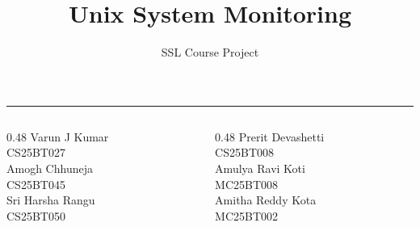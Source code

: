 \documentclass[aspectratio=169,10pt]{beamer}
\title[SysMon]{Unix System Monitoring}
\subtitle{SSL Course Project}
\author{}
\institute{}
\date{}
\begin{document}
\begin{frame}[plain]
    \centering
    \vspace*{0.75cm}
    {\color{ChampagneLight}\inserttitle\par}
    \vspace{0.18cm}
    {\color{Muted}\insertsubtitle\par}
    \vspace{0.42cm}
    {\color{Violet}\rule{0.14\linewidth}{1.2pt}}
    \vspace{0.55cm}

    \begin{columns}[T,onlytextwidth]
        \begin{column}{0.48\textwidth}
            \centering
            {\color{Ivory}\normalsize Varun J Kumar}\\[-1pt]
            {\color{Muted}\scriptsize CS25BT027}\\[0.30cm]
            {\color{Ivory}\normalsize Amogh Chhuneja}\\[-1pt]
            {\color{Muted}\scriptsize CS25BT045}\\[0.30cm]
            {\color{Ivory}\normalsize Sri Harsha Rangu}\\[-1pt]
            {\color{Muted}\scriptsize CS25BT050}
        \end{column}
        \begin{column}{0.48\textwidth}
            \centering
            {\color{Ivory}\normalsize Prerit Devashetti}\\[-1pt]
            {\color{Muted}\scriptsize CS25BT008}\\[0.30cm]
            {\color{Ivory}\normalsize Amulya Ravi Koti}\\[-1pt]
            {\color{Muted}\scriptsize MC25BT008}\\[0.30cm]
            {\color{Ivory}\normalsize Amitha Reddy Kota}\\[-1pt]
            {\color{Muted}\scriptsize MC25BT002}
        \end{column}
    \end{columns}
\end{frame}
\end{document}
